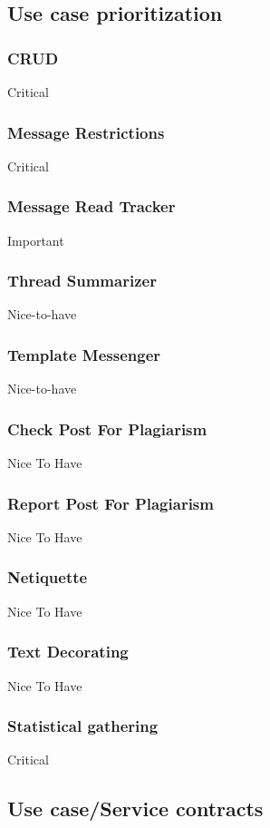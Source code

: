 \documentclass[12pt, oneside]{article}
\begin{document}
\subsection{Use case prioritization}
\subsubsection{CRUD}
Critical
\subsubsection{Message Restrictions}
Critical
\subsubsection{Message Read Tracker}
Important
\subsubsection{Thread Summarizer}
Nice-to-have
\subsubsection{Template Messenger}
Nice-to-have
\subsubsection{Check Post For Plagiarism}
Nice To Have
\subsubsection{Report Post For Plagiarism}
Nice To Have
\subsubsection{Netiquette}
Nice To Have
\subsubsection{Text Decorating}
Nice To Have
\subsubsection{Statistical gathering}
Critical


\subsection{Use case/Service contracts}
\end{document}
